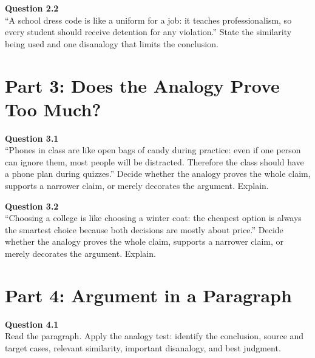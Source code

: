 \documentclass[12pt]{article}
\begin{document}

\textbf{Question 2.2}\\[-0.15em]
``A school dress code is like a uniform for a job: it teaches professionalism, so every student should receive detention for any violation.'' State the similarity being used and one disanalogy that limits the conclusion.


\newpage

\section*{Part 3: Does the Analogy Prove Too Much?}

\textbf{Question 3.1}\\[-0.15em]
``Phones in class are like open bags of candy during practice: even if one person can ignore them, most people will be distracted. Therefore the class should have a phone plan during quizzes.'' Decide whether the analogy proves the whole claim, supports a narrower claim, or merely decorates the argument. Explain.


\textbf{Question 3.2}\\[-0.15em]
``Choosing a college is like choosing a winter coat: the cheapest option is always the smartest choice because both decisions are mostly about price.'' Decide whether the analogy proves the whole claim, supports a narrower claim, or merely decorates the argument. Explain.


\newpage

\section*{Part 4: Argument in a Paragraph}

\textbf{Question 4.1}\\[-0.15em]
Read the paragraph. Apply the analogy test: identify the conclusion, source and target cases, relevant similarity, important disanalogy, and best judgment.

\vspace{0.2em}

\noindent{}
\end{document}
